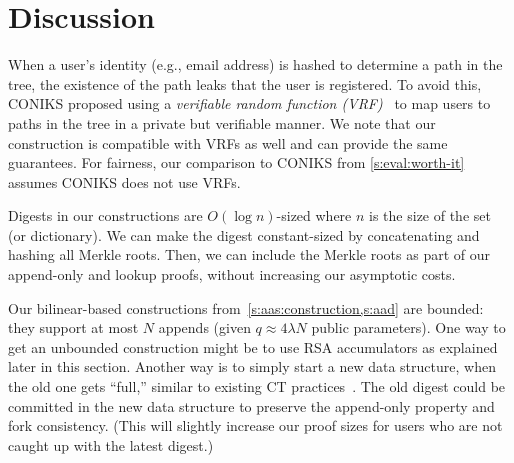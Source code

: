 \section{Discussion}
\label{s:discussion}
\label{s:aas:rsa}

When a user's identity (e.g., email address) is hashed to determine a path in the tree, the existence of the path leaks that the user is registered.
To avoid this, CONIKS proposed using a \textit{verifiable random function (VRF)}~\cite{coniks,vrf} to map users to paths in the tree in a private but verifiable manner.
We note that our construction is compatible with VRFs as well and can provide the same guarantees.
For fairness, our comparison to CONIKS from \cref{s:eval:worth-it} assumes CONIKS does not use VRFs.

Digests in our constructions are $O(\log{n})$-sized where $n$ is the size of the set (or dictionary).
We can make the digest constant-sized by concatenating and hashing all Merkle roots.
Then, we can include the Merkle roots as part of our append-only and lookup proofs, without increasing our asymptotic costs.

Our bilinear-based constructions from~\cref{s:aas:construction,s:aad} are bounded: they support at most $N$ appends (given $q \approx 4\lambda N$ public parameters).
One way to get an unbounded construction might be to use RSA accumulators as explained later in this section.
Another way is to simply start a new data structure, when the old one gets ``full,'' similar to existing CT practices~\cite{Lynch2018}.
The old digest could be committed in the new data structure to preserve the append-only property and fork consistency.
(This will slightly increase our proof sizes for users who are not caught up with the latest digest.)


